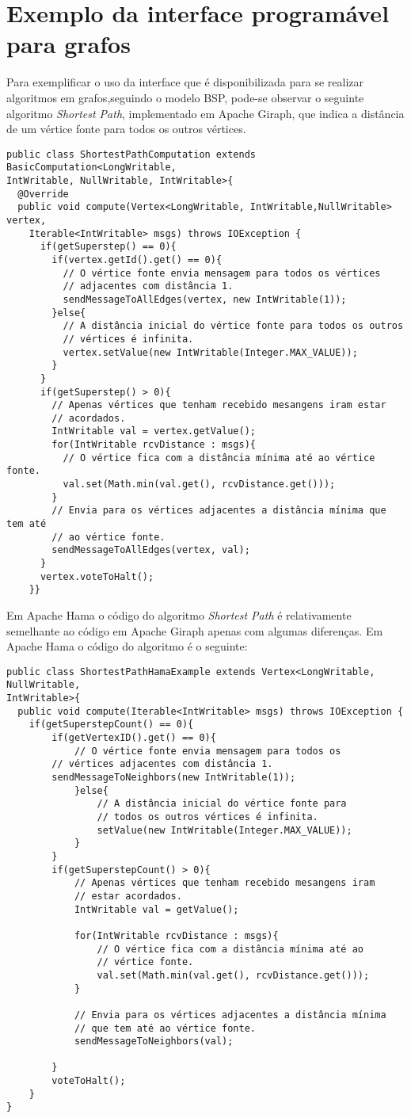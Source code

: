 \section{Exemplo da interface programável para grafos}

Para exemplificar o uso da interface que é disponibilizada para se 
realizar algoritmos em grafos,seguindo o modelo BSP, pode-se observar o 
seguinte algoritmo \textit{Shortest Path}, implementado em Apache Giraph, que 
indica a distância de um vértice fonte para todos os outros vértices.
\newpage
\begin{verbatim}
public class ShortestPathComputation extends BasicComputation<LongWritable, 
IntWritable, NullWritable, IntWritable>{
  @Override
  public void compute(Vertex<LongWritable, IntWritable,NullWritable> vertex, 
	Iterable<IntWritable> msgs) throws IOException {
	  if(getSuperstep() == 0){
	    if(vertex.getId().get() == 0){
	      // O vértice fonte envia mensagem para todos os vértices 
	      // adjacentes com distância 1.
	      sendMessageToAllEdges(vertex, new IntWritable(1));
	    }else{
	      // A distância inicial do vértice fonte para todos os outros 
	      // vértices é infinita.
	      vertex.setValue(new IntWritable(Integer.MAX_VALUE));			
	    }
	  }
	  if(getSuperstep() > 0){
	    // Apenas vértices que tenham recebido mesangens iram estar 
	    // acordados.
	    IntWritable val = vertex.getValue();		
	    for(IntWritable rcvDistance : msgs){
	      // O vértice fica com a distância mínima até ao vértice fonte.
	      val.set(Math.min(val.get(), rcvDistance.get()));
	    }
	    // Envia para os vértices adjacentes a distância mínima que tem até 
	    // ao vértice fonte.
	    sendMessageToAllEdges(vertex, val);		
	  } 
	  vertex.voteToHalt();
	}}
\end{verbatim}

Em Apache Hama o código do algoritmo \textit{Shortest Path} é relativamente 
semelhante ao código em Apache Giraph apenas com algumas diferenças. Em Apache 
Hama o código do algoritmo é o seguinte:

\begin{verbatim}
public class ShortestPathHamaExample extends Vertex<LongWritable, NullWritable, 
IntWritable>{
  public void compute(Iterable<IntWritable> msgs) throws IOException {
	if(getSuperstepCount() == 0){
		if(getVertexID().get() == 0){
			// O vértice fonte envia mensagem para todos os 
		// vértices adjacentes com distância 1.
		sendMessageToNeighbors(new IntWritable(1));
			}else{
				// A distância inicial do vértice fonte para 
				// todos os outros vértices é infinita.
				setValue(new IntWritable(Integer.MAX_VALUE));
			}
		}
		if(getSuperstepCount() > 0){
			// Apenas vértices que tenham recebido mesangens iram 
			// estar acordados.
			IntWritable val = getValue();
			
			for(IntWritable rcvDistance : msgs){
				// O vértice fica com a distância mínima até ao 
				// vértice fonte.
				val.set(Math.min(val.get(), rcvDistance.get()));
			}
			
			// Envia para os vértices adjacentes a distância mínima 
			// que tem até ao vértice fonte.
			sendMessageToNeighbors(val);
			
		}
		voteToHalt();	
	}
}
\end{verbatim}
